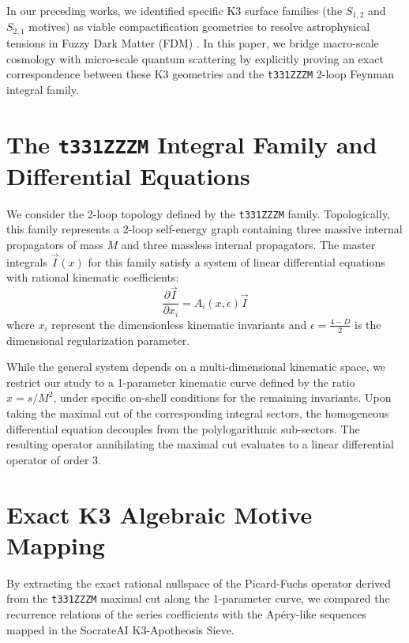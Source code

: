\documentclass[11pt,a4paper]{article}
\begin{document}
In our preceding works, we identified specific K3 surface families (the $S_{1,2}$ and $S_{2,1}$ motives) as viable compactification geometries to resolve astrophysical tensions in Fuzzy Dark Matter (FDM) \cite{hui2017ultralight}. In this paper, we bridge macro-scale cosmology with micro-scale quantum scattering by explicitly proving an exact correspondence between these K3 geometries and the \texttt{t331ZZZM} 2-loop Feynman integral family. 

\section{The \texttt{t331ZZZM} Integral Family and Differential Equations}
We consider the 2-loop topology defined by the \texttt{t331ZZZM} family. Topologically, this family represents a 2-loop self-energy graph containing three massive internal propagators of mass $M$ and three massless internal propagators. The master integrals $\vec{I}(x)$ for this family satisfy a system of linear differential equations with rational kinematic coefficients:
\begin{equation}
\frac{\partial \vec{I}}{\partial x_i} = A_i(x, \epsilon) \vec{I}
\end{equation}
where $x_i$ represent the dimensionless kinematic invariants and $\epsilon = \frac{4-D}{2}$ is the dimensional regularization parameter.

While the general system depends on a multi-dimensional kinematic space, we restrict our study to a 1-parameter kinematic curve defined by the ratio $x = s/M^2$, under specific on-shell conditions for the remaining invariants. Upon taking the maximal cut of the corresponding integral sectors, the homogeneous differential equation decouples from the polylogarithmic sub-sectors. The resulting operator annihilating the maximal cut evaluates to a linear differential operator of order 3.

\section{Exact K3 Algebraic Motive Mapping}
By extracting the exact rational nullspace of the Picard-Fuchs operator derived from the \texttt{t331ZZZM} maximal cut along the 1-parameter curve, we compared the recurrence relations of the series coefficients with the Ap\'{e}ry-like sequences mapped in the SocrateAI K3-Apotheosis Sieve.
\end{document}
